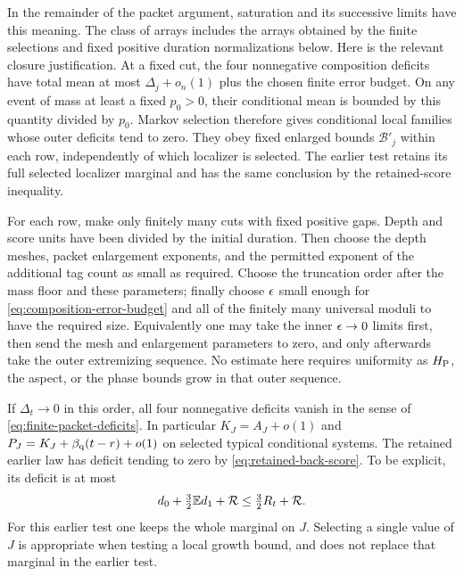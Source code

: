 In the remainder of the packet argument, saturation and its successive
limits have this meaning.  The class of arrays includes the arrays
obtained by the finite selections and fixed positive duration
normalizations below.  Here is the relevant closure justification.
At a fixed cut, the four nonnegative composition deficits have total
mean at most $\Delta_j+o_n(1)$ plus the chosen finite error budget.
On any event of mass at least a fixed $p_0>0$, their conditional mean
is bounded by this quantity divided by $p_0$.  Markov selection
therefore gives conditional local families whose outer deficits tend
to zero.  They obey fixed enlarged bounds $\mathcal B'_j$ within
each row, independently of which localizer is selected.  The earlier
test retains its full selected localizer marginal and has the same
conclusion by the retained-score inequality.

For each row, make only finitely many cuts with fixed positive gaps.
Depth and score units have been divided by the initial duration.
Then choose the depth meshes, packet enlargement exponents, and the
permitted exponent of the additional tag count as small as required.
Choose the truncation order after the mass floor and these parameters;
finally choose $\epsilon$ small enough for
\eqref{eq:composition-error-budget} and all of the finitely many
universal moduli to have the required size.  Equivalently one may take
the inner $\epsilon\to0$ limits first, then send the mesh and enlargement
parameters to zero, and only afterwards take the outer extremizing
sequence.  No estimate here requires uniformity as $H_{\mathrm P}$, the
aspect, or the phase bounds grow in that outer sequence.

If $\Delta_t\to0$ in this order, all four nonnegative deficits vanish
in the sense of \eqref{eq:finite-packet-deficits}.  In particular
$K_J=A_J+o(1)$ and $P_J=K_J+\beta_{\mathrm q}(t-r)+o(1)$ on selected typical
conditional systems.  The retained earlier law has deficit tending
to zero by \eqref{eq:retained-back-score}.  To be explicit, its deficit
is at most
\[
 d_0+\tfrac32\mathbb E d_1+\mathcal R
       \le\tfrac32 R_t+\mathcal R.
\]
For this earlier test one keeps the whole marginal on $J$.
Selecting a single value of $J$ is appropriate when testing a local
growth bound, and does not replace that marginal in the earlier test.

